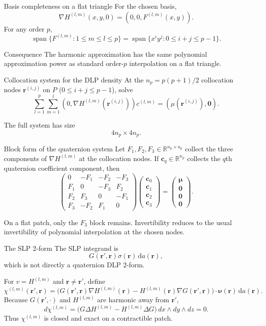 \documentclass[aspectratio=169,11pt]{beamer}
\newcommand{\R}{\mathbb{R}}
\newcommand{\dd}{\,\mathrm d}
\newcommand{\rvec}{\bm{r}}
\newcommand{\rp}{\bm{r}'}
\newcommand{\nuvec}{\bm{\nu}}
\DeclareMathOperator{\Span}{span}
\begin{document}
\begin{frame}{Basis completeness on a flat triangle}
\small
For the chosen basis,
\[
  \nabla H^{(l,m)}(x,y,0)
  =
  (0,0,F^{(l,m)}(x,y)).
\]
For any order $p$,
\[
  \Span\{F^{(l,m)}:1\le m\le l\le p\}
  =
  \Span\{x^iy^j:0\le i+j\le p-1\}.
\]

\begin{block}{Consequence}
The harmonic approximation has the same polynomial approximation power as
standard order-$p$ interpolation on a flat triangle.
\end{block}
\end{frame}

\begin{frame}{Collocation system for the DLP density}
\small
At the $n_p=p(p+1)/2$ collocation nodes $\rvec^{(i,j)}$ on $P$
($0\le i+j\le p-1$), solve
\[
  \sum_{l=1}^p\sum_{m=1}^l
  (0,\nabla H^{(l,m)}(\rvec^{(i,j)}))c^{(l,m)}
  =
  (\mu(\rvec^{(i,j)}),\bm0).
\]

The full system has size
\[
  4n_p\times 4n_p.
\]
\end{frame}

\begin{frame}{Block form of the quaternion system}
\small
Let $F_1,F_2,F_3\in\R^{n_p\times n_p}$ collect the three components of
$\nabla H^{(l,m)}$ at the collocation nodes.  If
$\bm c_q\in\R^{n_p}$ collects the $q$th quaternion coefficient component,
then
\[
\begin{pmatrix}
  0 & -F_1 & -F_2 & -F_3\\
  F_1 & 0 & -F_3 & F_2\\
  F_2 & F_3 & 0 & -F_1\\
  F_3 & -F_2 & F_1 & 0
\end{pmatrix}
\begin{pmatrix}\bm c_0\\\bm c_1\\\bm c_2\\\bm c_3\end{pmatrix}
=
\begin{pmatrix}\bm\mu\\\bm0\\\bm0\\\bm0\end{pmatrix}.
\]

On a flat patch, only the $F_3$ block remains. Invertibility reduces to the
usual invertibility of polynomial interpolation at the chosen nodes.
\end{frame}

\begin{frame}{The SLP 2-form}
\small
The SLP integrand is
\[
  G(\rp,\rvec)\sigma(\rvec)\dd a(\rvec),
\]
which is not directly a quaternion DLP 2-form.

For $v=H^{(l,m)}$ and $\rvec\ne\rp$, define
\[
  \chi^{(l,m)}(\rp,\rvec)
  =\bigl(G(\rp,\rvec)\nabla H^{(l,m)}(\rvec)
   -H^{(l,m)}(\rvec)\nabla G(\rp,\rvec)\bigr)
   \cdot\nuvec(\rvec)\dd a(\rvec).
\]
Because $G(\rp,\cdot)$ and $H^{(l,m)}$ are harmonic away from $\rp$,
\[
  d\chi^{(l,m)}
  =\bigl(G\Delta H^{(l,m)}-H^{(l,m)}\Delta G\bigr)
    \,dx\wedge dy\wedge dz=0.
\]
Thus $\chi^{(l,m)}$ is closed and exact on a contractible patch.
\end{frame}
\end{document}
